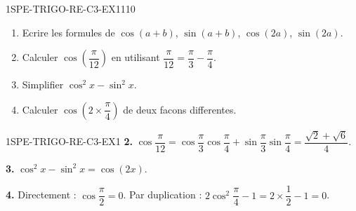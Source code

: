 

\begin{exercice}{1SPE-TRIGO-RE-C3-EX1}{1}{10}
\begin{enumerate}
  \item Ecrire les formules de $\cos(a+b)$, $\sin(a+b)$, $\cos(2a)$, $\sin(2a)$.
  \item Calculer $\cos\!\left(\dfrac{\pi}{12}\right)$ en utilisant $\dfrac{\pi}{12} = \dfrac{\pi}{3} - \dfrac{\pi}{4}$.
  \item Simplifier $\cos^2 x - \sin^2 x$.
  \item Calculer $\cos(2 \times \dfrac{\pi}{4})$ de deux facons differentes.
\end{enumerate}
\end{exercice}


\begin{corrige}{1SPE-TRIGO-RE-C3-EX1}
\textbf{2.} $\cos\dfrac{\pi}{12} = \cos\dfrac{\pi}{3}\cos\dfrac{\pi}{4} + \sin\dfrac{\pi}{3}\sin\dfrac{\pi}{4} = \dfrac{\sqrt{2}+\sqrt{6}}{4}$.

\textbf{3.} $\cos^2 x - \sin^2 x = \cos(2x)$.

\textbf{4.} Directement : $\cos\dfrac{\pi}{2} = 0$. Par duplication : $2\cos^2\dfrac{\pi}{4} - 1 = 2 \times \dfrac{1}{2} - 1 = 0$. \checkmark
\end{corrige}
